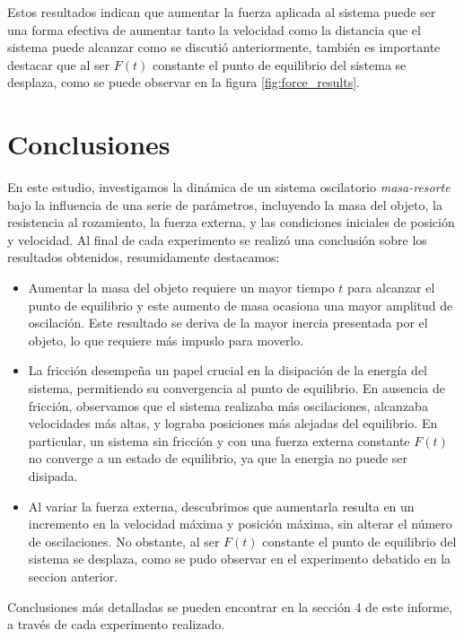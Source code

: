 \documentclass[]{article}
\begin{document}
Estos resultados indican que aumentar la fuerza aplicada al sistema puede ser una forma efectiva de aumentar tanto la velocidad como la distancia que el sistema puede alcanzar como se discutió anteriormente, también es importante destacar que al ser $F(t)$ constante el punto de equilibrio del sistema se desplaza, como se puede observar en la figura \ref{fig:force_results}.

\section{Conclusiones}
En este estudio, investigamos la dinámica de un sistema oscilatorio \textit{masa-resorte} bajo la influencia de una serie de parámetros, incluyendo la masa del objeto, la resistencia al rozamiento, la fuerza externa, y las condiciones iniciales de posición y velocidad. 
Al final de cada experimento se realizó una conclusión sobre los resultados obtenidos, resumidamente destacamos:

\begin{itemize}
\item Aumentar la masa del objeto requiere un mayor tiempo $t$  para alcanzar el punto de equilibrio y este aumento de masa ocasiona una mayor amplitud de oscilación. Este resultado se deriva de la mayor inercia presentada por el objeto, lo que requiere más impuslo para moverlo.
\item La fricción desempeña un papel crucial en la disipación de la energía del sistema, permitiendo su convergencia al punto de equilibrio. En ausencia de fricción, observamos que el sistema realizaba más oscilaciones, alcanzaba velocidades más altas, y lograba posiciones más alejadas del equilibrio. En particular, un sistema sin fricción y con una fuerza externa constante $F(t)$ no converge a un estado de equilibrio, ya que la energia no puede ser disipada.
\item Al variar la fuerza externa, descubrimos que aumentarla resulta en un incremento en la velocidad máxima y  posición máxima, sin alterar el número de oscilaciones. No obstante, al ser $F(t)$ constante el punto de equilibrio del sistema se desplaza, como se pudo observar en el experimento debatido en la seccion anterior.
\end{itemize}

Conclusiones más detalladas se pueden encontrar en la sección 4 de este informe, a través de cada experimento realizado.
\end{document}
